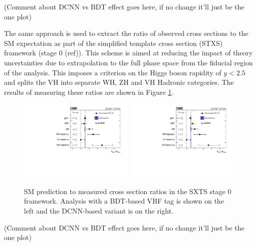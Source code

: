 (Comment about DCNN vs BDT effect goes here, if no change it'll just be the one plot)

The same approach is used to extract the ratio of observed cross sections to the SM expectation as part of the simplified template cross section (STXS) framework (stage 0 (ref)).
This scheme is aimed at reducing the impact of theory uncertainties due to extrapolation to the full phase space from the fiducial region of the analysis. 
This imposes a criterion on the Higgs boson rapidity of $y<2.5$ and splits the VH into separate WH, ZH and VH Hadronic categories. 
The results of measuring these ratios are shown in Figure \ref{fig:stats_results:stxs}.
\begin{figure}[h!]
    \begin{center}
        \includegraphics[width=0.49\textwidth]{figures/stats_results/CMS-HIG-16-040_Figure_018.pdf}
        \includegraphics[width=0.49\textwidth]{figures/stats_results/STXSPerProcessMuProfileMH.pdf}
    \end{center}
    \caption{SM prediction to measured cross section ratios in the SXTS stage 0 framework. Analysis with a BDT-based VBF tag is shown on the left and the DCNN-based variant is on the right.}
        \label{fig:stats_results:stxs}
\end{figure}

(Comment about DCNN vs BDT effect goes here, if no change it'll just be the one plot)

